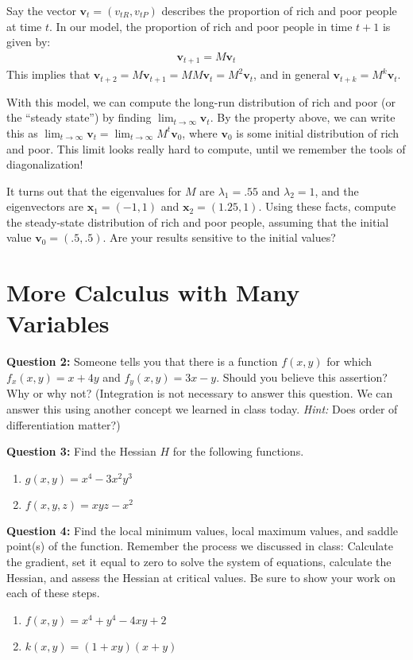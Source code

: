 \documentclass[10pt]{amsart}
\begin{document}
Say the vector $\mathbf{v}_t = (v_{tR}, v_{tP})$ describes the proportion of rich and poor people at time $t$. In our model, the proportion of rich and poor people in time $t+1$ is given by:
\begin{align*}
	\mathbf{v}_{t+1} = M \mathbf{v}_t
\end{align*}
This implies that $\mathbf{v}_{t+2} = M \mathbf{v}_{t+1} = M M \mathbf{v}_t = M^2 \mathbf{v}_t$, and in general $\mathbf{v}_{t+k} = M^{k} \mathbf{v}_t$.

With this model, we can compute the long-run distribution of rich and poor (or the ``steady state'') by finding $\lim_{t \to \infty} \mathbf{v}_t$. By the property above, we can write this as $\lim_{t \to \infty} \mathbf{v}_t = \lim_{t \to \infty} M^t \mathbf{v}_0$, where $\mathbf{v}_0$ is some initial distribution of rich and poor. This limit looks really hard to compute, until we remember the tools of diagonalization! 

It turns out that the eigenvalues for $M$ are $\lambda_1 = .55$ and $\lambda_2 = 1$, and the eigenvectors are $\mathbf{x}_1 = (-1, 1)$ and $\mathbf{x}_2 = (1.25, 1)$. Using these facts, compute the steady-state distribution of rich and poor people, assuming that the initial value $\mathbf{v}_0 = (.5, .5)$.  Are your results sensitive to the initial values?


\section{More Calculus with Many Variables}

\textbf{Question 2:} Someone tells you that there is a function $f(x,y)$ for which $f_x(x,y) = x + 4y$ and $f_y(x,y) = 3x-y$. Should you believe this assertion? Why or why not? (Integration is not necessary to answer this question. We can answer this using another concept we learned in class today. \textit{Hint:} Does order of differentiation matter?)


\medskip

\textbf{Question 3:} Find the Hessian $H$ for the following functions. 
\begin{enumerate}
	\item $g(x,y) = x^4 - 3x^2 y^3$
	\item $f(x,y,z) = xyz - x^2$
\end{enumerate}

\medskip


\textbf{Question 4:} Find the local minimum values, local maximum values, and saddle point(s) of the function. Remember the process we discussed in class: Calculate the gradient, set it equal to zero to solve the system of equations, calculate the Hessian, and assess the Hessian at critical values. Be sure to show your work on each of these steps.
\begin{enumerate}
\item $f(x,y) = x^4 + y^4 - 4xy + 2$
\item $k(x,y) = (1+xy)(x+y)$
\end{enumerate}
\end{document}
